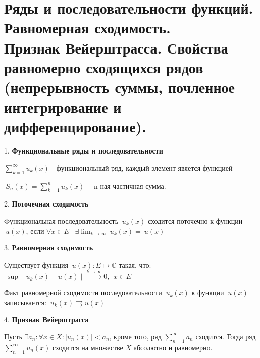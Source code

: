\section{
    Ряды и последовательности функций. Равномерная сходимость. \\
    Признак Вейерштрасса. Свойства равномерно сходящихся рядов \\
    (непрерывность суммы, почленное интегрирование и дифференцирование). 
}

1. \textbf{Функциональные ряды и последовательности}

$\displaystyle \sum _{{k=1}}^{{\infty }}{u_{k}}(x)$ - функциональный ряд, каждый элемент явяется функцией

${\displaystyle \ {S_{n}}(x)=\sum _{k=1}^{n}{u_{k}}(x)}$— n-ная частичная сумма.

2. \textbf{Поточечная сходимость}

Функциональная последовательность ${\displaystyle \ {u_{k}}(x)}$
сходится поточечно к функции ${\displaystyle \ {u}(x)}$, если 
${\displaystyle \forall x\in E\;\;\;\exists \lim _{k\rightarrow \infty }\ {u_{k}}(x)=\ {u}(x)}$

3. \textbf{Равномерная сходимость}

Существует функция ${\displaystyle \ u(x):E\mapsto \mathbb {C} }$
такая, что: ${\displaystyle \ \sup \mid {u_{k}}(x)-u(x)\mid {\stackrel {k\rightarrow \infty }{\longrightarrow }}0,~~x\in E}$

Факт равномерной сходимости последовательности ${\displaystyle \ {u_{k}}(x)}$
 к функции ${\displaystyle \ u(x)}$ записывается: 
 ${\displaystyle \ {u_{k}}(x)\rightrightarrows u(x)}$

4. \textbf{Признак Вейерштрасса}

Пусть ${\displaystyle \exists a_{n} : \forall x\in X : |u_{n}(x)|<a_{n}}$, кроме того, 
ряд ${\displaystyle \sum _{n=1}^{\infty }a_{n}}$ сходится. 
Тогда ряд ${\displaystyle \sum _{n=1}^{\infty }u_{n}(x)}$ сходится 
на множестве ${\displaystyle X}$ абсолютно и равномерно.

